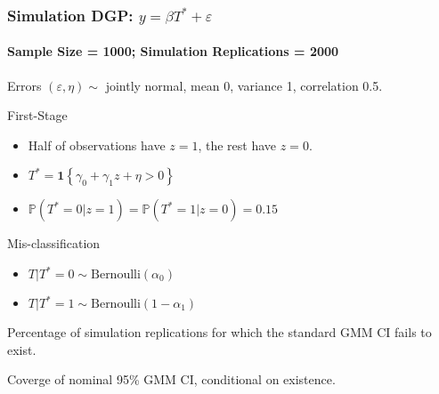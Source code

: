 \documentclass{beamer}
\begin{document}
\begin{frame}
  \frametitle{Simulation DGP: $y = \beta T^* + \varepsilon$}
  \framesubtitle{Sample Size = 1000;  Simulation Replications = 2000} 
  \begin{block}{Errors}
      $(\varepsilon, \eta) \sim $ jointly normal, mean 0, variance 1, correlation 0.5.
  \end{block}
  \begin{block}{First-Stage}
      \begin{itemize}
        \item Half of observations have $z=1$, the rest have $z=0$.
        \item $T^* = \mathbf{1}\left\{ \gamma_0 + \gamma_1 z + \eta > 0 \right\}$
        \item $\mathbb{P}(T^* = 0|z =1) = \mathbb{P}(T^*=1|z=0) = 0.15$
      \end{itemize}
  \end{block}
  \vspace{-1em}


  \begin{block}{Mis-classification}
      \begin{itemize}
        \item $T|T^*=0 \sim \mbox{Bernoulli}(\alpha_0)$
        \item $T|T^*=1 \sim \mbox{Bernoulli}(1-\alpha_1)$
      \end{itemize}
  \end{block}
  
\end{frame}
\begin{frame}
\begin{table}[htbp]
  \scriptsize
  \centering
  
  \caption{Percentage of simulation replications for which the standard GMM CI fails to exist.}
\end{table}
\end{frame}
\begin{frame}
\begin{table}[htbp]
  \scriptsize
  \centering
  
  \caption{Coverge of nominal 95\% GMM CI, conditional on existence.} 
\end{table}
\end{frame}
\end{document}
